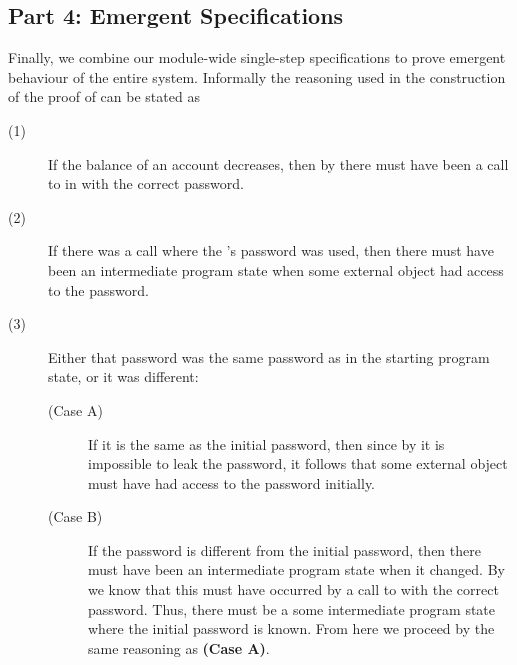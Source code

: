 \subsection{Part 4: Emergent \Nec Specifications}
Finally, we combine our module-wide single-step \Nec specifications to 
prove emergent behaviour of the entire system. Informally the
reasoning used in the construction of the proof of \SrobustB can be stated as
\begin{description}
\item [(1)]
If the balance of an account decreases, then
by  there must have been a call
to  in  with the correct password.
\item [(2)]
If there was a call where the 's password 
was used, then there must have been an intermediate program state
when some external object had access to the password.
\item [(3)]
Either that password was the same password as in the {starting} 
program state, or it was different:
\begin{description}
\item [(Case A)]
If it is the same as the initial password, then since by 
it is impossible to leak the password, it follows that some external object 
must have had access to the password initially.
\item [(Case B)]
If the password is different from the initial password, 
then there must have been an  {intermediate} program state when it 
changed. By  we know that this must have occurred
by a call to  with the correct password. Thus,
there must be a some  {intermediate} program state where the initial
password is known. From here we proceed by the same reasoning 
as \textbf{(Case A)}.
\end{description}
\end{description}
